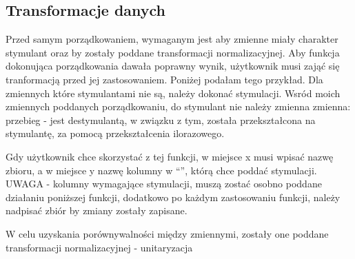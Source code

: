 \documentclass[12pt,a4paper]{report}
\begin{document}
{\subsection{Transformacje danych}\label{transformacje-danych}

Przed samym porządkowaniem, wymaganym jest aby zmienne miały charakter
stymulant oraz by zostały poddane transformacji normalizacyjnej. Aby
funkcja dokonująca porządkowania dawała poprawny wynik, użytkownik musi
zająć się tranformacją przed jej zastosowaniem. Poniżej podałam tego
przykład. Dla zmiennych które stymulantami nie są, należy dokonać
stymulacji. Wsród moich zmiennych poddanych porządkowaniu, do stymulant
nie należy zmienna zmienna: przebieg - jest destymulantą, w związku z
tym, została przekształcona na stymulantę, za pomocą przekształcenia
ilorazowego.

\begin{Shaded}
\begin{Highlighting}[]
  \NormalTok{:}
    \NormalTok{x[i,}\NormalTok{(}\NormalTok{(x)==y)]=}\NormalTok{/x[i,}\NormalTok{(}\NormalTok{(x)==y)]}
  \NormalTok{\}}
\NormalTok{\}}
\end{Highlighting}
\end{Shaded}

Gdy użytkownik chce skorzystać z tej funkcji, w miejsce x musi wpisać
nazwę zbioru, a w miejsce y nazwę kolumny w ``'', którą chce poddać
stymulacji. UWAGA - kolumny wymagające stymulacji, muszą zostać osobno
poddane działaniu poniższej funkcji, dodatkowo po każdym zastosowaniu
funkcji, należy nadpisać zbiór by zmiany zostały zapisane.

\begin{Shaded}
\begin{Highlighting}[]
\NormalTok{)}
\end{Highlighting}
\end{Shaded}

W celu uzyskania porównywalności między zmiennymi, zostały one poddane
transformacji normalizacyjnej - unitaryzacja

\begin{Shaded}
\begin{Highlighting}[]
  \NormalTok{:}
    \NormalTok{:}
    \NormalTok{\}}
  \NormalTok{\}}
\NormalTok{\}}


\end{Highlighting}
\end{Shaded}}
\end{document}
